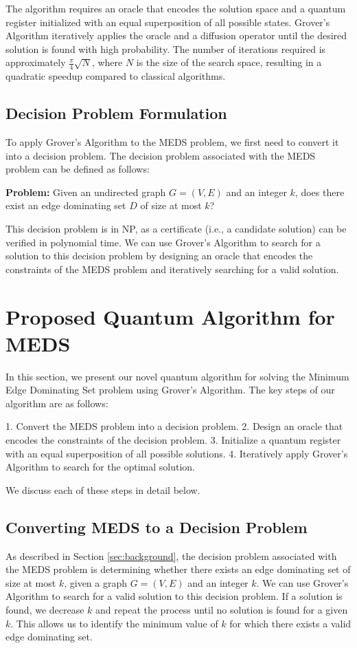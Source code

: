 The algorithm requires an oracle that encodes the solution space and a quantum register initialized with an equal superposition of all possible states. Grover's Algorithm iteratively applies the oracle and a diffusion operator until the desired solution is found with high probability. The number of iterations required is approximately $\frac{\pi}{4}\sqrt{N}$, where $N$ is the size of the search space, resulting in a quadratic speedup compared to classical algorithms.

\subsection{Decision Problem Formulation}
To apply Grover's Algorithm to the MEDS problem, we first need to convert it into a decision problem. The decision problem associated with the MEDS problem can be defined as follows:

\textbf{Problem:} Given an undirected graph $G=(V,E)$ and an integer $k$, does there exist an edge dominating set $D$ of size at most $k$?

This decision problem is in NP, as a certificate (i.e., a candidate solution) can be verified in polynomial time. We can use Grover's Algorithm to search for a solution to this decision problem by designing an oracle that encodes the constraints of the MEDS problem and iteratively searching for a valid solution.

\section{Proposed Quantum Algorithm for MEDS} \label{sec:algorithm}
In this section, we present our novel quantum algorithm for solving the Minimum Edge Dominating Set problem using Grover's Algorithm. The key steps of our algorithm are as follows:

1. Convert the MEDS problem into a decision problem.
2. Design an oracle that encodes the constraints of the decision problem.
3. Initialize a quantum register with an equal superposition of all possible solutions.
4. Iteratively apply Grover's Algorithm to search for the optimal solution.

We discuss each of these steps in detail below.

\subsection{Converting MEDS to a Decision Problem}
As described in Section \ref{sec:background}, the decision problem associated with the MEDS problem is determining whether there exists an edge dominating set of size at most $k$, given a graph $G=(V,E)$ and an integer $k$. We can use Grover's Algorithm to search for a valid solution to this decision problem. If a solution is found, we decrease $k$ and repeat the process until no solution is found for a given $k$. This allows us to identify the minimum value of $k$ for which there exists a valid edge dominating set.

